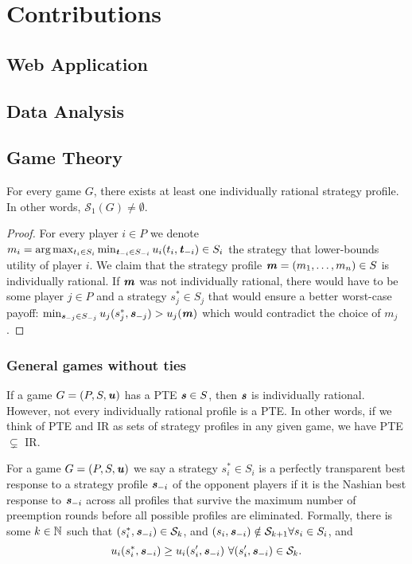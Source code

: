\chapter{Contributions}

\section{Web Application}
\section{Data Analysis}
\section{Game Theory}
\begin{lemma}
	For every game $G$, there exists at least one individually rational strategy profile.
	In other words, $\mathcal{S}_1(G) \ne \emptyset$.
\end{lemma}

\begin{proof}
	For every player $i \in P$ we denote $m_i = \text{arg} \max_{t_i \in S_i} \min_{\boldsymbol{\mathit{t}}_{-i} \in S_{-i}} u_i(t_i, \boldsymbol{\mathit{t}}_{-i}) \in S_i$ the strategy that lower-bounds utility of player $i$.
	We claim that the strategy profile $\boldsymbol{\mathit{m}} = (m_1, \dots, m_n) \in S$ is individually rational.
	If $\boldsymbol{\mathit{m}}$ was not individually rational, there would have to be some player $j \in P$ and a strategy $s_j^* \in S_j$ that would ensure a better worst-case payoff: $\min_{\boldsymbol{\mathit{s}}_{-j} \in S_{-j}}u_j(s_j^*, \boldsymbol{\mathit{s}}_{-j}) > u_j(\boldsymbol{\mathit{m}})$ which would contradict the choice of $m_j$.
\end{proof}

\subsection{General games without ties}

\begin{observation}
	\label{th:pte-subset-ir}
	If a game $G = (P, S, \boldsymbol{\mathit{u}})$ has a PTE $\boldsymbol{\mathit{s}} \in S$, then $\boldsymbol{\mathit{s}}$ is individually rational.
	However, not every individually rational profile is a PTE.
	In other words, if we think of PTE and IR as sets of strategy profiles in any given game, we have PTE $\subsetneq$ IR.
\end{observation}

\begin{definition}
	For a game $G = (P, S, \boldsymbol{\mathit{u}})$ we say a strategy $s_i^* \in S_i$ is a perfectly transparent best response to a strategy profile $\boldsymbol{\mathit{s}}_{-i}$ of the opponent players if it is the Nashian best response to $\boldsymbol{\mathit{s}}_{-i}$ across all profiles that survive the maximum number of preemption rounds before all possible profiles are eliminated.
	Formally, there is some $k \in \mathbb{N}$ such that $(s_i^*, \boldsymbol{\mathit{s}}_{-i}) \in \mathcal{S}_k$, and $(s_i, \boldsymbol{\mathit{s}}_{-i}) \notin \mathcal{S}_{k+1} \forall s_i \in S_i$, and
	\[
		u_i(s_i^*, \vecs_{-i}) \ge u_i(s_i', \vecs_{-i})\ \forall (s_i', \vecs_{-i}) \in \mathcal{S}_k.
	\]
\end{definition}

